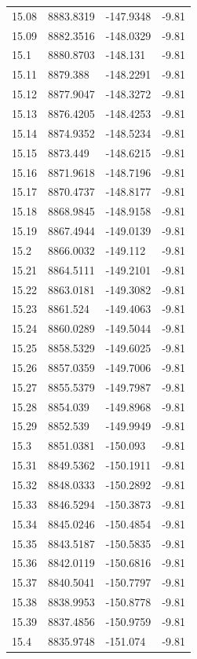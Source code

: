 \begin{table}[H]
\begin{tabular}{llll}
15.08 & 8883.8319 & -147.9348 & -9.81 \\
15.09 & 8882.3516 & -148.0329 & -9.81 \\
15.1 & 8880.8703 & -148.131 & -9.81 \\
15.11 & 8879.388 & -148.2291 & -9.81 \\
15.12 & 8877.9047 & -148.3272 & -9.81 \\
15.13 & 8876.4205 & -148.4253 & -9.81 \\
15.14 & 8874.9352 & -148.5234 & -9.81 \\
15.15 & 8873.449 & -148.6215 & -9.81 \\
15.16 & 8871.9618 & -148.7196 & -9.81 \\
15.17 & 8870.4737 & -148.8177 & -9.81 \\
15.18 & 8868.9845 & -148.9158 & -9.81 \\
15.19 & 8867.4944 & -149.0139 & -9.81 \\
15.2 & 8866.0032 & -149.112 & -9.81 \\
15.21 & 8864.5111 & -149.2101 & -9.81 \\
15.22 & 8863.0181 & -149.3082 & -9.81 \\
15.23 & 8861.524 & -149.4063 & -9.81 \\
15.24 & 8860.0289 & -149.5044 & -9.81 \\
15.25 & 8858.5329 & -149.6025 & -9.81 \\
15.26 & 8857.0359 & -149.7006 & -9.81 \\
15.27 & 8855.5379 & -149.7987 & -9.81 \\
15.28 & 8854.039 & -149.8968 & -9.81 \\
15.29 & 8852.539 & -149.9949 & -9.81 \\
15.3 & 8851.0381 & -150.093 & -9.81 \\
15.31 & 8849.5362 & -150.1911 & -9.81 \\
15.32 & 8848.0333 & -150.2892 & -9.81 \\
15.33 & 8846.5294 & -150.3873 & -9.81 \\
15.34 & 8845.0246 & -150.4854 & -9.81 \\
15.35 & 8843.5187 & -150.5835 & -9.81 \\
15.36 & 8842.0119 & -150.6816 & -9.81 \\
15.37 & 8840.5041 & -150.7797 & -9.81 \\
15.38 & 8838.9953 & -150.8778 & -9.81 \\
15.39 & 8837.4856 & -150.9759 & -9.81 \\
15.4 & 8835.9748 & -151.074 & -9.81 \\

\end{tabular}
\end{table}
